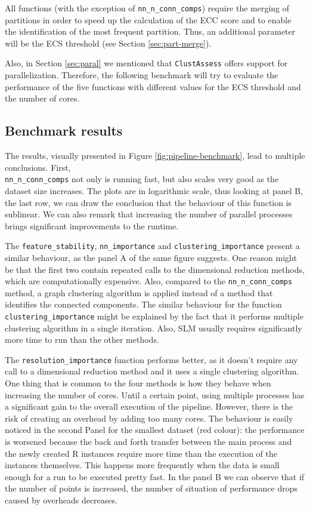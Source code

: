 All functions (with the exception of \verb|nn_n_conn_comps|) require the merging of partitions in order to speed up the calculation of the ECC score and to enable the identification of the most frequent partition. Thus, an additional parameter will be the ECS threshold (see Section \ref{sec:part-merge}).

Also, in Section \ref{sec:paral} we mentioned that \verb|ClustAssess| offers support for parallelization. Therefore, the following benchmark will try to evaluate the performance of the five functions with different values for the ECS threshold and the number of cores.

\subsection{Benchmark results}
The results, visually presented in Figure \ref{fig:pipeline-benchmark}, lead to multiple conclusions. First, \\ \verb|nn_n_conn_comps| not only is running fast, but also scales very good as the dataset size increases. The plots are in logarithmic scale, thus looking at panel B, the last row, we can draw the conclusion that the behaviour of this function is sublinear. We can also remark that increasing the number of parallel processes brings significant improvements to the runtime.

The \verb|feature_stability|, \verb|nn_importance| and \verb|clustering_importance| present a similar behaviour, as the panel A of the same figure suggests. One reason might be that the first two contain repeated calls to the dimensional reduction methods, which are computationally expensive. Also, compared to the \verb|nn_n_conn_comps| method, a graph clustering algorithm is applied instead of a method that identifies the connected components. The similar behaviour for the function \verb|clustering_importance| might be explained by the fact that it performs multiple clustering algorithm in a single iteration. Also, SLM usually requires significantly more time to run than the other methods.

The \verb|resolution_importance| function performs better, as it doesn't require any call to a dimensional reduction method and it uses a single clustering algorithm. One thing that is common to the four methods is how they behave when increasing the number of cores. Until a certain point, using multiple processes has a significant gain to the overall execution of the pipeline. However, there is the risk of creating an overhead by adding too many cores. The behaviour is easily noticed in the second Panel for the smallest dataset (red colour): the performance is worsened because the back and forth transfer between the main process and the newly created R instances require more time than the execution of the instances themselves. This happens more frequently when the data is small enough for a run to be executed pretty fast. In the panel B we can observe that if the number of points is increased, the number of situation of performance drops caused by overheads decreases.

